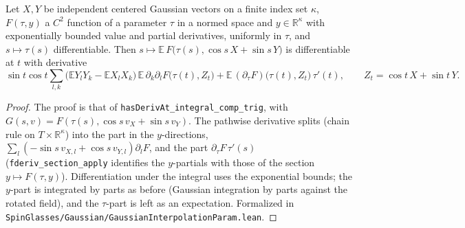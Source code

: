 \begin{lemma}\label{lem:sg-tal:perceptron-interpolation-param}
  \leanok
Let $X,Y$ be independent centered Gaussian vectors on a finite index set $\kappa$, $F(\tau,y)$ a $C^2$ function of a parameter $\tau$ in a normed space and $y\in\mathbb R^\kappa$ with
exponentially bounded value and partial derivatives, uniformly in $\tau$, and $s\mapsto\tau(s)$ differentiable. Then $s\mapsto\mathbb E\,F\bigl(\tau(s),\cos s\,X+\sin s\,Y\bigr)$ is differentiable at $t$
with derivative
\[
 \sin t\cos t\sum_{l,k}\bigl(\mathbb E Y_lY_k-\mathbb E X_lX_k\bigr)\,\mathbb E\,\partial_k\partial_lF\bigl(\tau(t),Z_t\bigr)
 +\mathbb E\,(\partial_\tau F)\bigl(\tau(t),Z_t\bigr)\,\tau'(t),\qquad Z_t=\cos t\,X+\sin t\,Y .
\]
\end{lemma}
\begin{proof}
  \leanok
The proof is that of \texttt{hasDerivAt\_integral\_comp\_trig}, with $G(s,v)=F(\tau(s),\cos s\,v_X+\sin s\,v_Y)$. The pathwise derivative splits (chain rule on $T\times\mathbb R^\kappa$) into the part in the $y$-directions,
$\sum_l(-\sin s\,v_{X,l}+\cos s\,v_{Y,l})\partial_lF$, and the part $\partial_\tau F\,\tau'(s)$ (\texttt{fderiv\_section\_apply} identifies the $y$-partials with those of the section $y\mapsto F(\tau,y)$). Differentiation under the
integral uses the exponential bounds; the $y$-part is integrated by parts as before (Gaussian integration by parts against the rotated field), and the $\tau$-part is left as an expectation.
Formalized in \texttt{SpinGlasses/Gaussian/GaussianInterpolationParam.lean}.
\end{proof}

